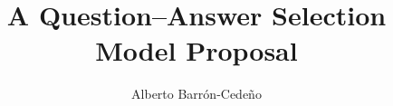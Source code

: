 \documentclass{sig-alternate-05-2015}
\begin{document}


%

\title{A Question--Answer Selection Model Proposal}

%
\author{Alberto Barr\'on-Cede\~no}
%


\maketitle
\begin{abstract}
\end{abstract}
\end{document}
